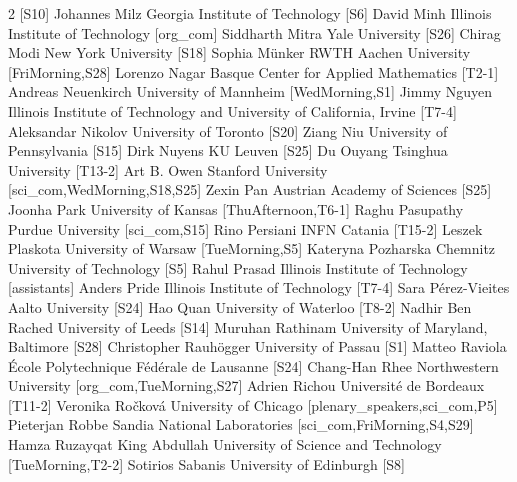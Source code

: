 \documentclass[12pt,lettersize,oneside]{book} %
\begin{document}
\begin{multicols}{2}
  [S10]
\participantne
  {Johannes Milz}
  {Georgia Institute of Technology}
  [S6]
\participantne
  {David Minh}
  {Illinois Institute of Technology}
  [org_com]
\participantne
  {Siddharth Mitra}
  {Yale University}
  [S26]
\participantne
  {Chirag Modi}
  {New York University}
  [S18]
\participantne
  {Sophia M\"unker}
  {RWTH Aachen University}
  [FriMorning,S28]
\participantne
  {Lorenzo Nagar}
  {Basque Center for Applied Mathematics}
  [T2-1]
\participantne
  {Andreas Neuenkirch}
  {University of Mannheim}
  [WedMorning,S1]
\participantne
  {Jimmy Nguyen}
  {Illinois Institute of Technology and University of California, Irvine}
  [T7-4]
\participantne
  {Aleksandar Nikolov}
  {University of Toronto}
  [S20]
\participantne
  {Ziang Niu}
  {University of Pennsylvania}
  [S15]
\participantne
  {Dirk Nuyens}
  {KU Leuven}
  [S25]
\participantne
  {Du Ouyang}
  {Tsinghua University}
  [T13-2]
\participantne
  {Art B. Owen}
  {Stanford University}
  [sci_com,WedMorning,S18,S25]
\participantne
  {Zexin Pan}
  {Austrian Academy of Sciences}
  [S25]
\participantne
  {Joonha Park}
  {University of Kansas}
  [ThuAfternoon,T6-1]
\participantne
  {Raghu Pasupathy}
  {Purdue University}
  [sci_com,S15]
\participantne
  {Rino Persiani}
  {INFN Catania}
  [T15-2]
\participantne
  {Leszek Plaskota}
  {University of Warsaw}
  [TueMorning,S5]
\participantne
  {Kateryna Pozharska}
  {Chemnitz University of Technology}
  [S5]
\participantne
  {Rahul Prasad}
  {Illinois Institute of Technology}
  [assistants]
\participantne
  {Anders Pride}
  {Illinois Institute of Technology}
  [T7-4]
\participantne
  {Sara P\'erez-Vieites}
  {Aalto University}
  [S24]
\participantne
  {Hao Quan}
  {University of Waterloo}
  [T8-2]
\participantne
  {Nadhir Ben Rached}
  {University of Leeds}
  [S14]
\participantne
  {Muruhan Rathinam}
  {University of Maryland, Baltimore}
  [S28]
\participantne
  {Christopher Rauh\"ogger}
  {University of Passau}
  [S1]
\participantne
  {Matteo Raviola}
  {\'Ecole Polytechnique F\'ed\'erale de Lausanne}
  [S24]
\participantne
  {Chang-Han Rhee}
  {Northwestern University}
  [org_com,TueMorning,S27]
\participantne
  {Adrien Richou}
  {Universit\'e de Bordeaux}
  [T11-2]
\participantne
  {Veronika Ro\v{c}kov\'a}
  {University of Chicago}
  [plenary_speakers,sci_com,P5]
\participantne
  {Pieterjan Robbe}
  {Sandia National Laboratories}
  [sci_com,FriMorning,S4,S29]
\participantne
  {Hamza Ruzayqat}
  {King Abdullah University of Science and Technology}
  [TueMorning,T2-2]
\participantne
  {Sotirios Sabanis}
  {University of Edinburgh}
  [S8]
\participantne

\end{multicols}
\end{document}
